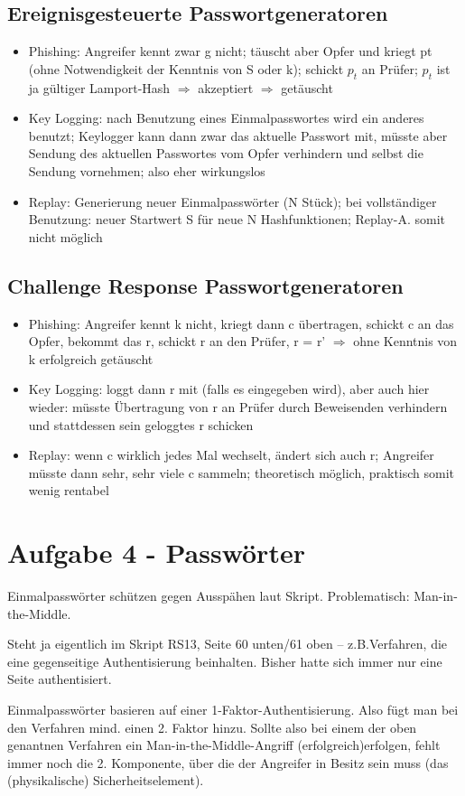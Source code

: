 \documentclass{scrartcl}
\begin{document}
\subsection*{Ereignisgesteuerte Passwortgeneratoren}
\begin{itemize}
  \item  Phishing: Angreifer kennt zwar g nicht; täuscht aber Opfer und kriegt pt (ohne Notwendigkeit der 
  Kenntnis von S oder k); schickt  $p_{t}$ an Prüfer;  $p_{t}$ ist ja gültiger Lamport-Hash $\Rightarrow$  
  akzeptiert $\Rightarrow$  getäuscht
  \item Key Logging:  nach Benutzung eines Einmalpasswortes wird ein anderes benutzt; Keylogger kann dann zwar das
  aktuelle Passwort mit, müsste aber Sendung des aktuellen Passwortes vom Opfer verhindern und selbst die Sendung
  vornehmen; also eher wirkungslos
  \item Replay:  Generierung neuer Einmalpasswörter (N Stück); bei vollständiger Benutzung: neuer Startwert 
  S für neue N Hashfunktionen; Replay-A. somit nicht möglich
\end{itemize}

\subsection*{Challenge Response Passwortgeneratoren}
\begin{itemize}
\item  Phishing: Angreifer kennt k nicht, kriegt dann c übertragen, schickt c an das Opfer, bekommt das 
r, schickt r an den Prüfer, r = r' $\Rightarrow$  ohne Kenntnis von k erfolgreich getäuscht
\item Key Logging: loggt dann r mit (falls es eingegeben wird), aber auch hier wieder: müsste Übertragung 
von r an Prüfer durch Beweisenden verhindern und stattdessen sein geloggtes r schicken
\item Replay: wenn c wirklich jedes Mal wechselt, ändert sich auch r; Angreifer müsste dann sehr, sehr 
viele c sammeln; theoretisch möglich, praktisch somit wenig rentabel
\end{itemize}

\section*{Aufgabe 4 - Passwörter}


Einmalpasswörter schützen gegen Ausspähen laut Skript. Problematisch: Man-in-the-Middle.
\newline

Steht ja eigentlich im Skript RS13, Seite 60 unten/61 oben –  z.B.Verfahren, die eine gegenseitige 
Authentisierung beinhalten. Bisher hatte sich immer nur eine Seite authentisiert.
\newline

Einmalpasswörter basieren auf einer 1-Faktor-Authentisierung. Also fügt man bei den Verfahren mind. einen 2. Faktor
hinzu. Sollte also bei einem der oben genantnen Verfahren ein Man-in-the-Middle-Angriff (erfolgreich)erfolgen, fehlt immer noch die 2. Komponente, über die der Angreifer in Besitz sein muss (das (physikalische) Sicherheitselement).
\end{document}
